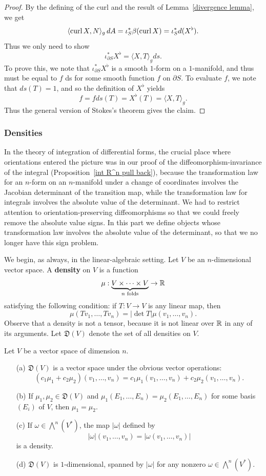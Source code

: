 \begin{proof}
By the defining of the curl and the result of Lemma~\ref{divergence lemma}, we get
\[\langle\mathrm{curl}\, X,N\rangle_g\,dA=\iota^*_S\beta(\mathrm{curl}\, X)=\iota_S^*d(X^\flat).\]
Thus we only need to show
\[\iota_{\partial S}^*X^\flat=\langle X,T\rangle_gds.\]
To prove this, we note that $\iota_{\partial S}^*X^\flat$ is a smooth $1$-form on a $1$-manifold, and thus must be equal to $f$ ds for some smooth function $f$ on $\partial S$. To evaluate $f$, we note that $ds(T)=1$, and so the definition of $X^\flat$ yields
\[f=fds(T)=X^\flat(T)=\langle X,T\rangle_g.\]
Thus the general version of Stokes's theorem gives the claim.
\end{proof}
\subsubsection{Densities}
In the theory of integration of differential forms, the crucial place where orientations entered the 
picture was in our proof of the diffeomorphism-invariance of
the integral (Proposition~\ref{int R^n pull back}), because the transformation law for an $n$-form on 
an $n$-manifold under a change of coordinates involves the Jacobian determinant of the transition map, 
while the transformation law for integrals involves the absolute value of the determinant. We had to 
restrict attention to orientation-preserving diffeomorphisms so that we could freely remove the absolute 
value signs. In this part we define objects whose transformation law involves the absolute value of the determinant, so that we no longer have this sign problem.\par
We begin, as always, in the linear-algebraic setting. Let $V$ be an $n$-dimensional
vector space. A \textbf{density} on $V$ is a function
\[\mu:\underbrace{V\times\cdots\times V}_{\text{$n$ folds}}\to\mathbb{R}\]
satisfying the following condition: if $T:V\to V$ is any linear map, then
\[\mu(Tv_1,\dots,Tv_n)=|\det T|\mu(v_1,\dots,v_n).\]
Observe that a density is not a tensor, because it is not linear over $\mathbb{R}$ in any of its arguments. 
Let $\mathfrak{D}(V)$ denote the set of all densities on $V$.
\begin{proposition}\label{density prop}
Let $V$ be a vector space of dimension $n$.
\begin{itemize}
\item[(a)] $\mathfrak{D}(V)$ is a vector space under the obvious vector operations:
\[(c_1\mu_1+c_2\mu_2)(v_1,\dots,v_n)=c_1\mu_1(v_1,\dots,v_n)+c_2\mu_2(v_1,\dots,v_n).\] 
\item[(b)] If $\mu_1,\mu_2\in\mathfrak{D}(V)$ and $\mu_1(E_1,\dots,E_n)=\mu_2(E_1,\dots,E_n)$ for some basis $(E_i)$ 
of $V$, then $\mu_1=\mu_2$.
\item[(c)] If $\omega\in\bigwedge^n(V^*)$, the map $|\omega|$ defined by
\[|\omega|(v_1,\dots,v_n)=|\omega(v_1,\dots,v_n)|\]
is a density.
\item[(d)] $\mathfrak{D}(V)$ is $1$-dimensional, spanned by $|\omega|$ for any nonzero $\omega\in\bigwedge^n(V^*)$.
\end{itemize}
\end{proposition}
